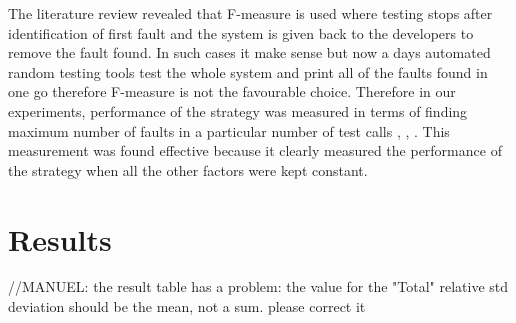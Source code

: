 \documentclass[conference]{IEEEtran}
\begin{document}

  
The literature review revealed that F-measure is used where testing stops after identification of first fault and the system is given back to the developers to remove the fault found. In such cases it make sense but now a days automated random testing tools test the whole system and print all of the faults found in one go therefore F-measure is not the favourable choice. Therefore in our experiments, performance of the strategy was measured in terms of finding maximum number of faults in a particular number of test calls   \cite{Pacheco2007a}, \cite{Ciupa2007}, \cite{Ciupa2008b}. This measurement was found effective because it clearly measured the performance of the strategy when all the other factors were kept constant.



\section{Results}\label{sec:res}

//MANUEL: the result table has a problem: the value for the "Total" relative std deviation should be the mean, not a sum. please correct it
\end{document}
